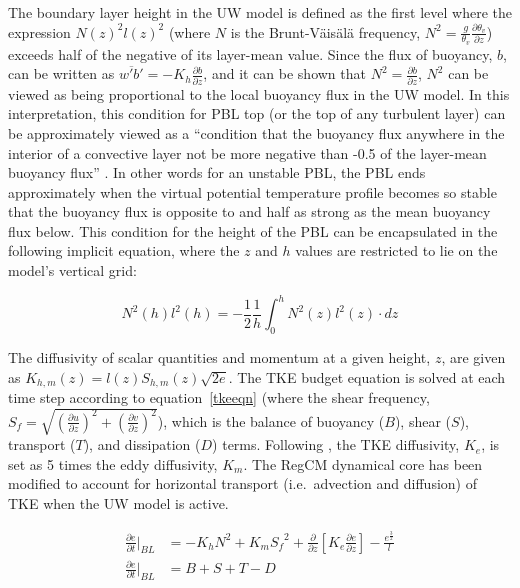 The boundary layer height in the UW model is defined as the first level where
the expression $N(z)^2 l(z)^2$ (where $N$ is the Brunt-V\"{a}is\"{a}l\"{a}
frequency, $N^2 = \frac{g}{\theta_v}\frac{\partial \theta_v}{\partial z}$)
exceeds half of the negative of its layer-mean value.  Since the flux of
buoyancy, $b$, can be written as $\overline{w'b'} = -K_h \frac{\partial
b}{\partial z}$, and it can be shown that $N^2 = \frac{\partial b}{\partial
z}$, $N^2$ can be viewed as being proportional to the local buoyancy flux in
the UW model.  In this interpretation, this condition for PBL top (or the top
of any turbulent layer) can be approximately viewed as a ``condition that the
buoyancy flux anywhere in the interior of a convective layer not be more
negative than -0.5 of the layer-mean buoyancy flux'' \citep{Bretherton_04}.  In
other words for an unstable PBL, the PBL ends approximately when the virtual
potential temperature profile becomes so stable that the buoyancy flux is
opposite to and half as strong as the mean buoyancy flux below.  This condition
for the height of the PBL can be encapsulated in the following implicit
equation, where the $z$ and $h$ values are restricted to lie on the model's
vertical grid:

\begin{equation}\label{uwheight}
N^2(h)l^2(h) = -\frac{1}{2}\frac{1}{h}\int_{0}^{h}N^2(z)l^2(z)\cdot dz
\end{equation}

The diffusivity of scalar quantities and momentum at a given height, $z$, are
given as $K_{h,m}(z) = l(z) S_{h,m}(z) \sqrt{2 e}$.  The TKE budget equation is
solved at each time step according to equation~\ref{tkeeqn} (where the shear
frequency, $S_f = \sqrt{(\frac{\partial u }{\partial z})^2 + (\frac{\partial v
}{\partial z})^2}$), which is the balance of buoyancy ($B$), shear ($S$),
transport ($T$), and dissipation ($D$) terms.  Following \cite{Grenier_01},
the TKE diffusivity, $K_e$, is set as 5 times the eddy diffusivity, $K_m$.  The
RegCM dynamical core has been modified to account for horizontal transport
(i.e.~advection and diffusion) of TKE when the UW model is active.

\begin{subequations}\label{tkeeqn}
\begin{align}
\frac{\partial e}{\partial t}\Bigr\rvert_{BL}&= -K_h N^2 + K_m {S_f}^2 + \frac{\partial}{\partial z}[K_e \frac{\partial e}{\partial z}] - \frac{e^{\frac{3}{2}}}{l}\\
\frac{\partial e}{\partial t}\Bigr\rvert_{BL}&= B + S + T - D
\end{align}
\end{subequations}

